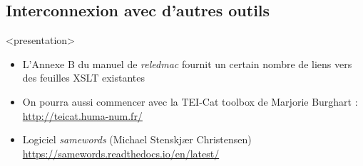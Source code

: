 \documentclass[transnotheorems,noamsthm]{beamer}
\newenvironment{slide}{%
  \begin{frame}
  <presentation>\mode<presentation>{\frametitle{\insertsubsection}}%
  }%
  {\end{frame}}
\newcommand{\package}[1]{\emph{#1}}
\begin{document}
\subsection{Interconnexion avec d'autres outils}
\begin{slide}
  \begin{itemize}
    \item L'Annexe B du manuel de \package{reledmac} fournit un certain nombre de liens vers des feuilles XSLT existantes
    \item On pourra aussi commencer avec la TEI-Cat toolbox de Marjorie Burghart : \url{http://teicat.huma-num.fr/}
    \item Logiciel \package{samewords} (Michael Stenskjær Christensen)  \\
 \url{https://samewords.readthedocs.io/en/latest/}
  \end{itemize}
\end{slide}
\end{document}
